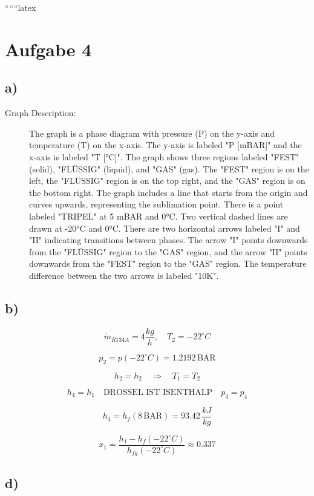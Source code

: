 
``````latex


\section*{Aufgabe 4}

\subsection*{a)}

\begin{description}
    \item[Graph Description:] The graph is a phase diagram with pressure (P) on the y-axis and temperature (T) on the x-axis. The y-axis is labeled "P [mBAR]" and the x-axis is labeled "T [°C]". The graph shows three regions labeled "FEST" (solid), "FLÜSSIG" (liquid), and "GAS" (gas). The "FEST" region is on the left, the "FLÜSSIG" region is on the top right, and the "GAS" region is on the bottom right. The graph includes a line that starts from the origin and curves upwards, representing the sublimation point. There is a point labeled "TRIPEL" at 5 mBAR and 0°C. Two vertical dashed lines are drawn at -20°C and 0°C. There are two horizontal arrows labeled "I" and "II" indicating transitions between phases. The arrow "I" points downwards from the "FLÜSSIG" region to the "GAS" region, and the arrow "II" points downwards from the "FEST" region to the "GAS" region. The temperature difference between the two arrows is labeled "10K".
\end{description}

\subsection*{b)}

\[
\dot{m}_{R134A} = 4 \frac{kg}{h}, \quad T_2 = -22^\circ C
\]

\[
p_2 = p(-22^\circ C) = 1.2192 \, \text{BAR}
\]

\[
h_2 = h_2 \quad \Rightarrow \quad T_1 = T_2
\]

\[
h_4 = h_1 \quad \text{DROSSEL IST ISENTHALP} \quad p_3 = p_4
\]

\[
h_{4} = h_{f} (8 \, \text{BAR}) = 93.42 \, \frac{kJ}{kg}
\]

\[
x_1 = \frac{h_1 - h_f (-22^\circ C)}{h_{fg} (-22^\circ C)} \approx 0.337
\]

\subsection*{d)}

